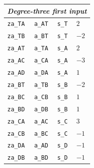 \begin{longtable}{llll}
\multicolumn{4}{l}{\textit{Degree-three first input}}\\\hline
\texttt{za\_TA} & \texttt{a\_AT} & \texttt{s\_T} & $2$\\
\texttt{za\_TB} & \texttt{a\_BT} & \texttt{s\_T} & $-2$\\
\texttt{za\_AT} & \texttt{a\_TA} & \texttt{s\_A} & $2$\\
\texttt{za\_AC} & \texttt{a\_CA} & \texttt{s\_A} & $-3$\\
\texttt{za\_AD} & \texttt{a\_DA} & \texttt{s\_A} & $1$\\
\texttt{za\_BT} & \texttt{a\_TB} & \texttt{s\_B} & $-2$\\
\texttt{za\_BC} & \texttt{a\_CB} & \texttt{s\_B} & $1$\\
\texttt{za\_BD} & \texttt{a\_DB} & \texttt{s\_B} & $1$\\
\texttt{za\_CA} & \texttt{a\_AC} & \texttt{s\_C} & $3$\\
\texttt{za\_CB} & \texttt{a\_BC} & \texttt{s\_C} & $-1$\\
\texttt{za\_DA} & \texttt{a\_AD} & \texttt{s\_D} & $-1$\\
\texttt{za\_DB} & \texttt{a\_BD} & \texttt{s\_D} & $-1$\\
\hline\end{longtable}
